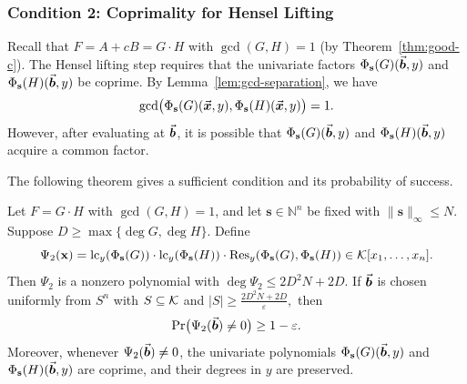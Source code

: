 \documentclass{article}
\numberwithin{equation}{section}
\begin{document}
\subsubsection*{Condition 2: Coprimality for Hensel Lifting}

Recall that $F = A + cB = G \cdot H$ with $\gcd(G, H) = 1$ (by Theorem~\ref{thm:good-c}). The Hensel lifting step requires that the univariate factors $\Phi_{\mathbf{s}}(G)(\vec{\boldsymbol{b}}, y)$ and $\Phi_{\mathbf{s}}(H)(\vec{\boldsymbol{b}}, y)$ be coprime. By Lemma~\ref{lem:gcd-separation}, we have
\[
\gcd\bigl( \Phi_{\mathbf{s}}(G)(\vec{\boldsymbol{x}}, y), \Phi_{\mathbf{s}}(H)(\vec{\boldsymbol{x}}, y) \bigr) = 1.
\]
However, after evaluating at $\vec{\boldsymbol{b}}$, it is possible that $\Phi_{\mathbf{s}}(G)(\vec{\boldsymbol{b}}, y)$ and $\Phi_{\mathbf{s}}(H)(\vec{\boldsymbol{b}}, y)$ acquire a common factor.

The following theorem gives a sufficient condition and its probability of success.

\begin{theorem}\label{thm:b-condition2}
Let $F = G \cdot H$ with $\gcd(G, H) = 1$, and let $\mathbf{s} \in \mathbb{N}^n$ be fixed with $\|\mathbf{s}\|_\infty \le N$. Suppose $D \ge \max\{\deg G, \deg H\}$. Define
\[
\Psi_2(\mathbf{x}) = \operatorname{lc}_y(\Phi_{\mathbf{s}}(G)) \cdot \operatorname{lc}_y(\Phi_{\mathbf{s}}(H)) \cdot \operatorname{Res}_y(\Phi_{\mathbf{s}}(G), \Phi_{\mathbf{s}}(H)) \in {\mathcal{K}}[x_1, \dots, x_n].
\]
Then $\Psi_2$ is a nonzero polynomial with
%
$\deg \Psi_2 \le 2D^2 N + 2D.$
%
If $\vec{\boldsymbol{b}}$ is chosen uniformly from $S^n$ with $S \subseteq {\mathcal{K}}$ and
%
$|S| \ge \frac{2D^2 N + 2D}{\varepsilon},$
%
then
\[
\Pr\bigl( \Psi_2(\vec{\boldsymbol{b}}) \neq 0 \bigr) \ge 1 - \varepsilon.
\]
Moreover, whenever $\Psi_2(\vec{\boldsymbol{b}}) \neq 0$, the univariate polynomials $\Phi_{\mathbf{s}}(G)(\vec{\boldsymbol{b}}, y)$ and $\Phi_{\mathbf{s}}(H)(\vec{\boldsymbol{b}}, y)$ are coprime, and their degrees in $y$ are preserved.
\end{theorem}
\end{document}
